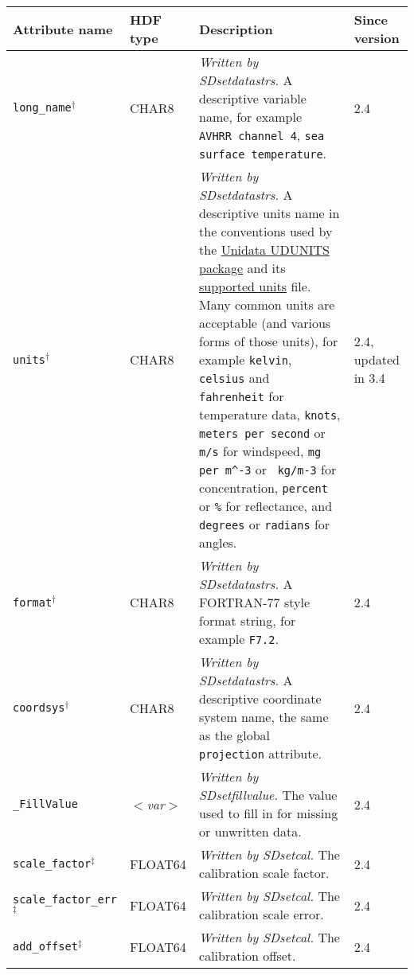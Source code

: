 \begin{tabular}{|l|l|p{7.5cm}|l|}

  \hline 

  Attribute name & HDF type & Description & Since version \\ \hline

  {\tt long\_name}$^{\dagger}$ & CHAR8 & {\em Written
  by SDsetdatastrs.} A descriptive variable name, for example {\tt
  AVHRR channel 4}, {\tt sea surface temperature}. &2.4 \\ \hline

  {\tt units}$^{\dagger}$ & CHAR8 & {\em Written by SDsetdatastrs.} A
  descriptive units name in the conventions used by the
  \href{http://my.unidata.ucar.edu/content/software/udunits/index.html}{Unidata
  UDUNITS package} and its
  \href{http://my.unidata.ucar.edu/content/software/udunits/udunits.txt}{supported
  units} file. Many common units are acceptable (and various forms of
  those units), for example {\tt kelvin}, {\tt celsius} and {\tt
  fahrenheit} for temperature data, {\tt knots}, {\tt meters per
  second} or {\tt m/s} for windspeed, {\tt mg per m\^{}-3} or {\tt
  kg/m-3} for concentration, {\tt percent} or {\tt \%} for
  reflectance, and {\tt degrees} or {\tt radians} for angles. & 2.4,
  updated in 3.4 \\ \hline

  {\tt format}$^{\dagger}$ & CHAR8 & {\em Written by SDsetdatastrs.} A
  FORTRAN-77 style format string, for example {\tt F7.2}. & 2.4 \\
  \hline

  {\tt coordsys}$^{\dagger}$ & CHAR8 & {\em Written by SDsetdatastrs.}
  A descriptive coordinate system name, the same as the global {\tt
  projection} attribute. & 2.4 \\ \hline

  {\tt \_FillValue} & {\it $<$var$>$} & {\em Written by
  SDsetfillvalue.} The value used to fill in for missing or unwritten
  data. & 2.4 \\ \hline

  {\tt scale\_factor}$^{\ddagger}$ & FLOAT64 & {\em Written by
  SDsetcal.} The calibration scale factor. & 2.4 \\ \hline

  {\tt scale\_factor\_err}$^{\ddagger}$ & FLOAT64 & {\em Written by
  SDsetcal.} The calibration scale error. & 2.4 \\ \hline

  {\tt add\_offset}$^{\ddagger}$ & FLOAT64 & {\em Written by
  SDsetcal.} The calibration offset. & 2.4 \\ \hline


\end{tabular}
